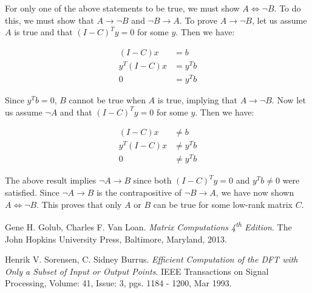 \documentclass{article}[11pt]
\begin{document}
   For only one of the above statements to be true, we must show $A \iff \neg B$. To do this, we must show that $A \rightarrow \neg B$ and $\neg B \rightarrow A$. To prove $A \rightarrow \neg B$, let us assume $A$ is true and that $(I-C)^Ty = 0$ for some $y$. Then we have:
   
   \begin{align*}
   (I-C)x &= b \\
   y^T(I - C)x &= y^Tb \\
   0 &= y^Tb
   \end{align*}
   
   Since $y^Tb = 0$, $B$ cannot be true when $A$ is true, implying that $A \rightarrow \neg B$. Now let us assume $\neg A$ and that $(I-C)^Ty = 0$ for some $y$. Then we have:
   
   \begin{align*}
   (I-C)x &\neq b \\
   y^T(I-C)x & \neq y^Tb  \\
   0 &\neq  y^Tb
   \end{align*}
   
   The above result implies $\neg  A \rightarrow B$ since both $(I-C)^Ty = 0$ and $y^Tb \neq 0$ were satisfied. Since $\neg A \rightarrow B$ is the contrapositive of $\neg B \rightarrow A$, we have now shown $ A \iff \neg B$. This proves that only $A$ or $B$ can be true for some low-rank matrix $C$.
   
   
   
\begin{thebibliography}{9}
Gene H. Golub, Charles F. Van Loan. 
\textit{Matrix Computations 4\textsuperscript{th} Edition}. 
The John Hopkins University Press, Baltimore, Maryland, 2013.
 
Henrik V. Sorensen, C. Sidney Burrus.
\textit{Efficient Computation of the DFT with Only a Subset of Input or Output Points}.
IEEE Transactions on Signal Processing, Volume: 41, Issue: 3, pgs. 1184 - 1200, Mar 1993.
\end{thebibliography}
\end{document}
